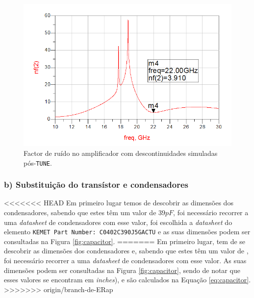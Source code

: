 \documentclass[11pt]{article}
\numberwithin{equation}{section}
\begin{document}
\begin{figure}[H]
	\centering
	\includegraphics[keepaspectratio=true, scale=0.45]{exps/descont_noise_pos_tune}
	\vspace{-0.5em}
	\caption{Factor de ruído no amplificador com descontinuidades simuladas pós-\texttt{TUNE}.}
	\vspace{-0.8em}
	\label{fig:descont_noise_pos_tune}
\end{figure}



\subsubsection{b) Substituição do transístor e condensadores}

<<<<<<< HEAD
Em primeiro lugar temos de descobrir as dimensões dos condensadores, sabendo que estes têm um valor de $ 39 pF $, foi necessário recorrer a uma \textit{datasheet} de condensadores com esse valor, foi escolhida a \textit{datasheet} do elemento \texttt{KEMET Part Number: C0402C390J5GACTU} e as suas dimensões podem ser consultadas na Figura \ref{fig:capacitor}.
=======
Em primeiro lugar, tem de se descobrir as dimensões dos condensadores e, sabendo que estes têm um valor de , foi necessário recorrer a uma \textit{datasheet} de condensadores com esse valor. As suas dimensões podem ser consultadas na Figura \ref{fig:capacitor}, sendo de notar que esses valores se encontram em \textit{inches}), e são calculados na Equação \ref{eq:capacitor}.
>>>>>>> origin/branch-de-ERap
\end{document}

